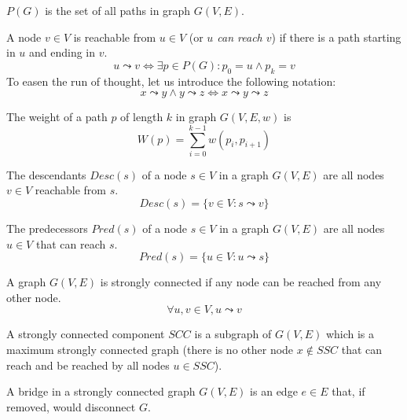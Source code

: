 \begin{definition}
    $P(G)$ is the set of all paths in graph $G(V,E)$.
\end{definition}
\begin{definition}[Reachability]
    A node $v \in V$ is reachable from $u \in V$ (or \emph{$u$ can reach $v$}) if there is a path starting in $u$ and ending in $v$.
    \begin{equation*}
        u \leadsto v \iff \exists p \in P(G) \colon p_0 = u \wedge p_k = v
    \end{equation*}
    To easen the run of thought, let us introduce the following notation:
    \begin{equation*}
        x \leadsto y \wedge y \leadsto z \iff x \leadsto y \leadsto z
    \end{equation*}
\end{definition}
\begin{definition}
    The weight of a path $p$ of length $k$ in graph $G(V,E,w)$ is
    \begin{equation*}
        W(p) = \sum_{i=0}^{k-1}{w(p_i, p_{i+1})}
    \end{equation*}
\end{definition}
\begin{definition}[Descendants] The descendants $Desc(s)$ of a node $s \in V$ in a graph $G(V,E)$ are all nodes $v \in V$ reachable from $s$.
    \begin{equation*}
        Desc(s) = \{v \in V : s \leadsto v\}
    \end{equation*}
\end{definition}
\begin{definition}[Predecessors] The predecessors $Pred(s)$ of a node $s \in V$ in a graph $G(V,E)$ are all nodes $u \in V$ that can reach $s$.
    \begin{equation*}
        Pred(s) = \{u \in V : u \leadsto s\}
    \end{equation*}
\end{definition}
\begin{definition}
    A graph $G(V, E)$ is strongly connected if any node can be reached from any other node.
    \begin{equation*}
        \forall u, v \in V, u \leadsto v
    \end{equation*}
\end{definition}
\begin{definition}
    A strongly connected component $SCC$ is a subgraph of $G(V, E)$ which is a maximum strongly connected graph (there is no other node $x \not \in SSC$ that can reach and be reached by all nodes $u \in SSC$).
\end{definition}
\begin{definition}[Bridge]
    A bridge in a strongly connected graph $G(V,E)$ is an edge $e \in E$ that, if removed, would disconnect $G$.
\end{definition}
